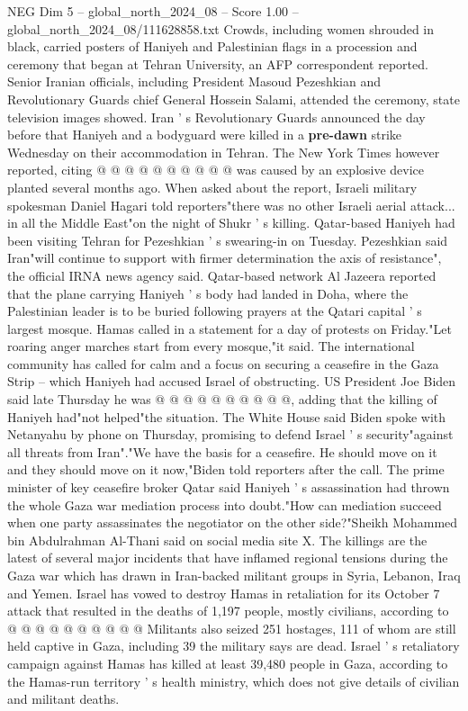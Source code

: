 \begin{textsample}{NEG Dim 5 – global\_north\_2024\_08 – Score 1.00 – global\_north\_2024\_08/111628858.txt}
Crowds, including women shrouded in black, carried posters of Haniyeh and Palestinian flags in a procession and ceremony that began at Tehran University, an AFP correspondent reported.
Senior Iranian officials, including President Masoud Pezeshkian and Revolutionary Guards chief General Hossein Salami, attended the ceremony, state television images showed.
Iran ' s Revolutionary Guards announced the day before that Haniyeh and a bodyguard were killed in a \textbf{pre-dawn} strike Wednesday on their accommodation in Tehran.
The New York Times however reported, citing @ @ @ @ @ @ @ @ @ @ was caused by an explosive device planted several months ago.
When asked about the report, Israeli military spokesman Daniel Hagari told reporters"there was no other Israeli aerial attack... in all the Middle East"on the night of Shukr ' s killing.
Qatar-based Haniyeh had been visiting Tehran for Pezeshkian ' s swearing-in on Tuesday.
Pezeshkian said Iran"will continue to support with firmer determination the axis of resistance", the official IRNA news agency said.
Qatar-based network Al Jazeera reported that the plane carrying Haniyeh ' s body had landed in Doha, where the Palestinian leader is to be buried following prayers at the Qatari capital ' s largest mosque.
Hamas called in a statement for a day of protests on Friday."Let roaring anger marches start from every mosque,"it said.
The international community has called for calm and a focus on securing a ceasefire in the Gaza Strip -- which Haniyeh had accused Israel of obstructing.
US President Joe Biden said late Thursday he was @ @ @ @ @ @ @ @ @ @, adding that the killing of Haniyeh had"not helped"the situation.
The White House said Biden spoke with Netanyahu by phone on Thursday, promising to defend Israel ' s security"against all threats from Iran"."We have the basis for a ceasefire.
He should move on it and they should move on it now,"Biden told reporters after the call.
The prime minister of key ceasefire broker Qatar said Haniyeh ' s assassination had thrown the whole Gaza war mediation process into doubt."How can mediation succeed when one party assassinates the negotiator on the other side?"Sheikh Mohammed bin Abdulrahman Al-Thani said on social media site X.
The killings are the latest of several major incidents that have inflamed regional tensions during the Gaza war which has drawn in Iran-backed militant groups in Syria, Lebanon, Iraq and Yemen.
Israel has vowed to destroy Hamas in retaliation for its October 7 attack that resulted in the deaths of 1,197 people, mostly civilians, according to @ @ @ @ @ @ @ @ @ @ Militants also seized 251 hostages, 111 of whom are still held captive in Gaza, including 39 the military says are dead.
Israel ' s retaliatory campaign against Hamas has killed at least 39,480 people in Gaza, according to the Hamas-run territory ' s health ministry, which does not give details of civilian and militant deaths.

\end{textsample}
